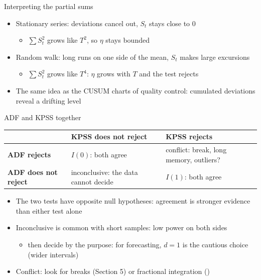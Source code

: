 \begin{frame}{Interpreting the partial sums}
\itemsize{\small}
\begin{itemize}
    \item Stationary series: deviations cancel out, $S_t$ stays close to 0
    \begin{itemize}
        \item $\sum S_t^2$ grows like $T^2$, so $\eta$ stays bounded
    \end{itemize}
    \item Random walk: long runs on one side of the mean, $S_t$ makes large excursions
    \begin{itemize}
        \item $\sum S_t^2$ grows like $T^4$: $\eta$ grows with $T$ and the test rejects
    \end{itemize}
    \item The same idea as the CUSUM charts of quality control: cumulated deviations reveal a drifting level
\end{itemize}
\end{frame}

\begin{frame}{ADF and KPSS together}
\itemsize{\small}
\begin{center}
\footnotesize
\begin{tabular}{lll}
\toprule
& \textbf{KPSS does not reject} & \textbf{KPSS rejects} \\
\midrule
\textbf{ADF rejects} & $I(0)$: both agree & conflict: break, long memory, outliers? \\
\textbf{ADF does not reject} & inconclusive: the data cannot decide & $I(1)$: both agree \\
\bottomrule
\end{tabular}
\end{center}
\begin{itemize}
    \item The two tests have opposite null hypotheses: agreement is stronger evidence than either test alone
    \item Inconclusive is common with short samples: low power on both sides
    \begin{itemize}
        \item then decide by the purpose: for forecasting, $d = 1$ is the cautious choice (wider intervals)
    \end{itemize}
    \item Conflict: look for breaks (Section 5) or fractional integration ()
\end{itemize}
\end{frame}

